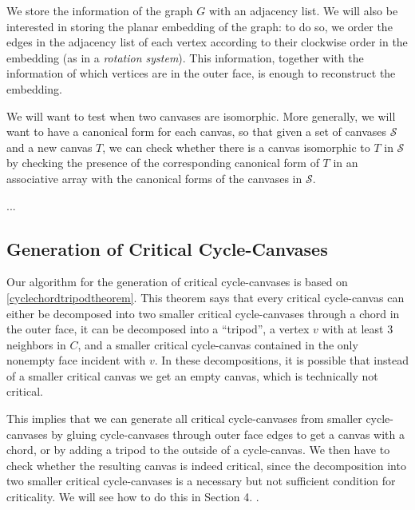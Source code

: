 We store the information of the graph $G$ with an adjacency list. We will also be interested in storing the planar embedding of the graph:
to do so, we order the edges in the adjacency list of each vertex according to their clockwise order in the embedding (as in a
\emph{rotation system}). This information, together with the information of which vertices are in the outer face, is enough to reconstruct
the embedding. 

We will want to test when two canvases are isomorphic. More generally, we will want to have a canonical form for each canvas, so that
given a set of canvases $\mathcal{S}$ and a new canvas $T$, we can check whether there is a canvas isomorphic to $T$ in $\mathcal{S}$ by checking the 
presence of the corresponding canonical form of $T$ in an associative array with the canonical forms of the canvases in $\mathcal{S}$.


...

\subsection{Generation of Critical Cycle-Canvases}

Our algorithm for the generation of critical cycle-canvases is based on \ref{cyclechordtripodtheorem}. 
This theorem says that every critical cycle-canvas can either be decomposed into two smaller critical 
cycle-canvases through a chord in the outer face, it can be decomposed into a ``tripod'', a vertex $v$ 
with at least $3$ neighbors in $C$, and a smaller critical cycle-canvas contained in the only nonempty 
face incident with $v$. In these decompositions, it is possible that instead of a smaller critical canvas 
we get an empty canvas, which is technically not critical. 

This implies that we can generate all critical cycle-canvases from smaller cycle-canvases by gluing
cycle-canvases through outer face edges to get a canvas with a chord, or by adding a tripod to the
outside of a cycle-canvas. We then have to check whether the resulting canvas is indeed critical,
since the decomposition into two smaller critical cycle-canvases is a necessary but not sufficient condition
for criticality. We will see how to do this in Section 4. .



